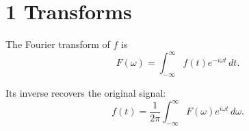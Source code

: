 \documentclass{article}
\begin{document}
\section*{1 Transforms}

The Fourier transform of $f$ is
\begin{equation}
    F(\omega) = \int_{-\infty}^{\infty} f(t) e^{-i\omega t} \, dt.
\end{equation}

Its inverse recovers the original signal:
\begin{equation}
    f(t) = \frac{1}{2\pi} \int_{-\infty}^{\infty} F(\omega) e^{i\omega t} \, d\omega.
\end{equation}
\end{document}
